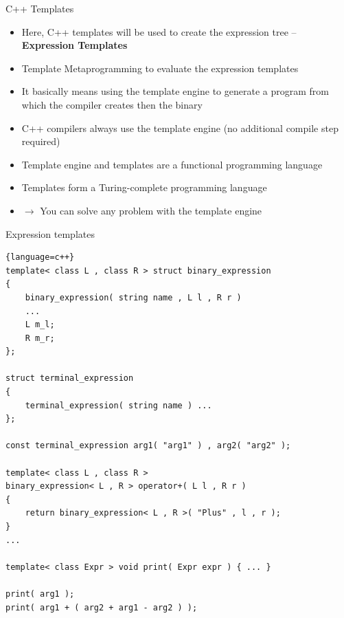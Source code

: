 \documentclass{beamer}
\begin{document}
\begin{frame}{C++ Templates}
 \begin{itemize}
  \item Here, C++ templates will be used to create the expression tree -- \textbf{Expression Templates}
  \item Template Metaprogramming to evaluate the expression templates
  \item It basically means using the template engine to generate a program from which the compiler creates then the binary
        \item C++ compilers always use the template engine (no additional compile step required)
 \end{itemize}

 \pause

 \begin{itemize}
         \item Template engine and templates are a functional programming language
         \item Templates form a Turing-complete programming language
         \item $\longrightarrow$ You can solve any problem with the template engine
 \end{itemize}

\end{frame}






\begin{frame}[fragile]{Expression templates}

\begin{lstlisting}{language=c++}
template< class L , class R > struct binary_expression
{
    binary_expression( string name , L l , R r )
    ... 
    L m_l;
    R m_r;
};

struct terminal_expression
{
    terminal_expression( string name ) ...
};

const terminal_expression arg1( "arg1" ) , arg2( "arg2" );

template< class L , class R >
binary_expression< L , R > operator+( L l , R r )
{
    return binary_expression< L , R >( "Plus" , l , r );
}
...

template< class Expr > void print( Expr expr ) { ... }

print( arg1 );
print( arg1 + ( arg2 + arg1 - arg2 ) );
\end{lstlisting}



\end{frame}
\end{document}
